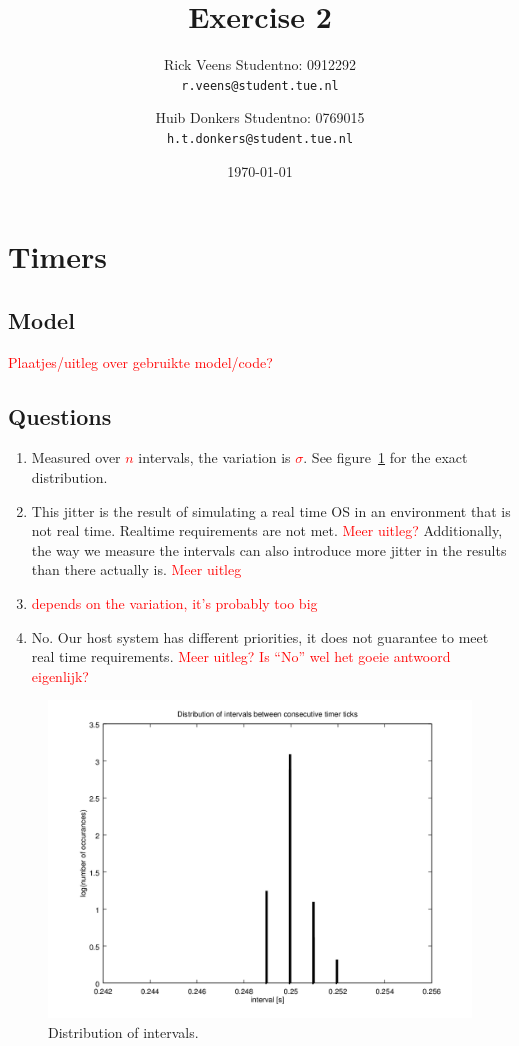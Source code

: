 \documentclass[a4paper,twoside,11pt]{article}
\title{\vspace{-\baselineskip}\sffamily\bfseries Exercise 2}
\author{
	Rick Veens \qquad Studentno: 0912292\\
	\texttt{r.veens@student.tue.nl}
	\and
	Huib Donkers \qquad Studentno: 0769015\\
	\texttt{h.t.donkers@student.tue.nl}
}
\date{\today}
\newcommand{\todo}[1]{\textcolor{red}{#1}}
\begin{document}
\maketitle

\section{Timers}
\subsection{Model}
\todo{Plaatjes/uitleg over gebruikte model/code?}

\subsection{Questions}
\begin{enumerate}
 \item Measured over \todo{$n$} intervals, the variation is \todo{$\sigma$}. See figure~\ref{fig:interval-jitter} for the exact distribution.
 
 \item This jitter is the result of simulating a real time OS in an environment that is not real time. Realtime requirements are not met. \todo{Meer uitleg?} Additionally, the way we measure the intervals can also introduce more jitter in the results than there actually is. \todo{Meer uitleg}
 
 \item \todo{depends on the variation, it's probably too big}
 
 \item No. Our host system has different priorities, it does not guarantee to meet real time requirements. \todo{Meer uitleg? Is ``No'' wel het goeie antwoord eigenlijk?}
 
 
\end{enumerate}

\begin{figure}
 \centering
 \includegraphics{./img/interval-jitter.png}
 \caption{Distribution of intervals.}
 \label{fig:interval-jitter}
\end{figure}
\end{document}
